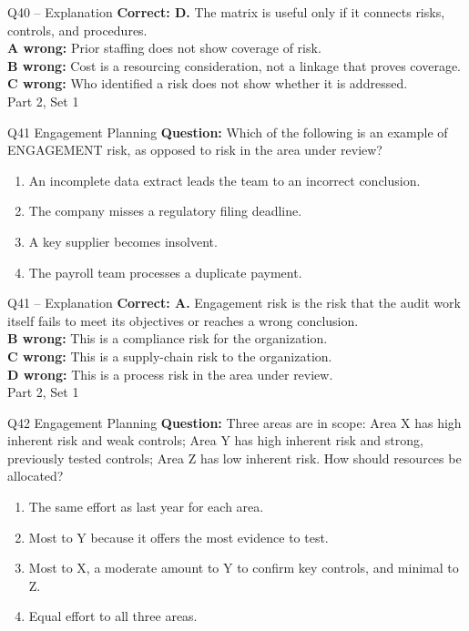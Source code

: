 \documentclass[aspectratio=169,10pt]{beamer}
\begin{document}
\begin{frame}[t]{Q40 -- Explanation}
	\footnotesize
	\textbf{Correct: D.} The matrix is useful only if it connects risks, controls, and procedures. \\[5pt]
\textbf{A wrong:} Prior staffing does not show coverage of risk. \\[3pt]
\textbf{B wrong:} Cost is a resourcing consideration, not a linkage that proves coverage. \\[3pt]
\textbf{C wrong:} Who identified a risk does not show whether it is addressed. \\[3pt]
	\vfill {\tiny Part 2, Set 1}
\end{frame}
\begin{frame}[t]{Q41 \hfill {\scriptsize Engagement Planning}}
	\small
	\textbf{Question:} Which of the following is an example of ENGAGEMENT risk, as opposed to risk in the area under review?
	\begin{enumerate}[label=\Alph*.,itemsep=1pt,topsep=3pt]
			\item An incomplete data extract leads the team to an incorrect conclusion.
			\item The company misses a regulatory filing deadline.
			\item A key supplier becomes insolvent.
			\item The payroll team processes a duplicate payment.
	\end{enumerate}
\end{frame}
\begin{frame}[t]{Q41 -- Explanation}
	\footnotesize
	\textbf{Correct: A.} Engagement risk is the risk that the audit work itself fails to meet its objectives or reaches a wrong conclusion. \\[5pt]
\textbf{B wrong:} This is a compliance risk for the organization. \\[3pt]
\textbf{C wrong:} This is a supply-chain risk to the organization. \\[3pt]
\textbf{D wrong:} This is a process risk in the area under review. \\[3pt]
	\vfill {\tiny Part 2, Set 1}
\end{frame}
\begin{frame}[t]{Q42 \hfill {\scriptsize Engagement Planning}}
	\small
	\textbf{Question:} Three areas are in scope: Area X has high inherent risk and weak controls; Area Y has high inherent risk and strong, previously tested controls; Area Z has low inherent risk. How should resources be allocated?
	\begin{enumerate}[label=\Alph*.,itemsep=1pt,topsep=3pt]
			\item The same effort as last year for each area.
			\item Most to Y because it offers the most evidence to test.
			\item Most to X, a moderate amount to Y to confirm key controls, and minimal to Z.
			\item Equal effort to all three areas.
	\end{enumerate}
\end{frame}
\end{document}
